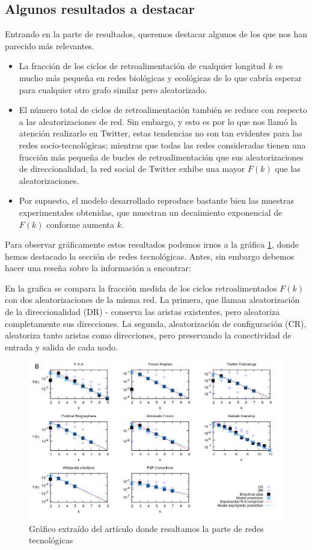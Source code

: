 \documentclass[1p]{elsarticle}
\begin{document}
\subsection{Algunos resultados a destacar}
Entrando en la parte de resultados, queremos destacar algunos de los que nos han parecido más relevantes.
\begin{itemize}
	\item La fracción de los ciclos de retroalimentación de cualquier longitud $k$ es mucho más pequeña en redes biológicas y ecológicas de lo que cabría esperar para cualquier otro grafo similar pero aleatorizado.
	\item El número total de ciclos de retroalimentación también se reduce 
	con respecto a las aleatorizaciones de red. Sin embargo, y esto es por lo que nos llamó la atención realizarlo en Twitter, estas tendencias no son tan evidentes para las redes socio-tecnológicas; mientras que todas las redes consideradas tienen una fracción más pequeña de bucles de retroalimentación que sus aleatorizaciones de direccionalidad, la red social de Twitter exhibe una mayor $F(k)$ que las aleatorizaciones.
	\item Por supuesto, el modelo desarrollado reproduce bastante bien las muestras experimentales obtenidas, que muestran un decaimiento exponencial de $F(k)$ conforme aumenta $k$.
\end{itemize}

Para observar gráficamente estos resultados podemos irnos a la gráfica \ref{h1}, donde hemos destacado la sección de redes tecnológicas. Antes, sin embargo debemos hacer una reseña sobre la información a encontrar:

 En la grafica se compara la fracción medida de los ciclos retroalimentados $F(k)$ con dos aleatorizaciones de la misma red. La primera, que llaman aleatorización de la direccionalidad (DR) - conserva las aristas existentes, pero aleatoriza completamente sus direcciones. La segunda, aleatorización de configuración (CR), aleatoriza tanto aristas como direcciones, pero preservando la conectividad de entrada y salida de cada nodo.
\begin{figure}
	\centering
	\includegraphics[width=15cm]{graf_2.png}
	\caption{Gráfico extraído del artículo donde resaltamos la parte de redes tecnológicas}
	\label{h1}
\end{figure}
\end{document}
